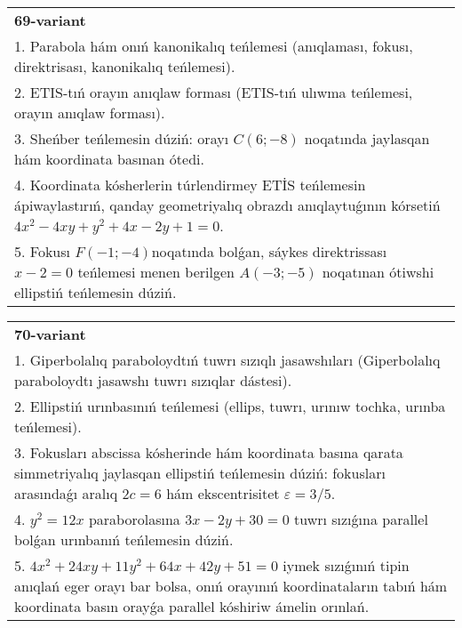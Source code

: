 \documentclass{article}
\begin{document}
\begin{tabular}{m{17cm}}
\textbf{69-variant}\\
1. Parabola hám onıń kanonikalıq teńlemesi (anıqlaması, fokusı, direktrisası, kanonikalıq teńlemesi).\\

2. ETIS-tıń orayın anıqlaw forması (ETIS-tıń ulıwma teńlemesi, orayın anıqlaw forması).\\

3. Sheńber teńlemesin dúziń: orayı $C (6 ;-8) $ noqatında jaylasqan hám koordinata basınan ótedi.\\

4. Koordinata kósherlerin túrlendirmey ETİS teńlemesin ápiwaylastırıń, qanday geometriyalıq obrazdı anıqlaytuǵının kórsetiń $4x^{2} - 4xy + y^{2} + 4x - 2y + 1 = 0$.  \\

5. Fokusı $F( - 1; - 4)$noqatında bolǵan, sáykes direktrissası $x - 2 = 0$ teńlemesi menen berilgen $A( - 3; - 5)$ noqatınan ótiwshi ellipstiń teńlemesin dúziń.  
\end{tabular}
\vspace{1cm}


\begin{tabular}{m{17cm}}
\textbf{70-variant}\\
1. Giperbolalıq paraboloydtıń tuwrı sızıqlı jasawshıları (Giperbolalıq paraboloydtı jasawshı tuwrı sızıqlar dástesi).\\

2. Ellipstiń urınbasınıń teńlemesi (ellips, tuwrı, urınıw tochka, urınba teńlemesi).\\

3. Fokusları abscissa kósherinde hám koordinata basına qarata simmetriyalıq jaylasqan ellipstiń teńlemesin dúziń: fokusları arasındaǵı aralıq $2 c=6$ hám ekscentrisitet $\varepsilon=3/5$.\\

4. $y^{2} = 12x$ paraborolasına $3x - 2y + 30 = 0$ tuwrı sızıǵına parallel bolǵan urınbanıń teńlemesin dúziń.  \\

5. $4x^{2} + 24xy + 11y^{2} + 64x + 42y + 51 = 0$ iymek sızıǵınıń tipin anıqlań eger orayı bar bolsa, onıń orayınıń koordinataların tabıń hám koordinata basın orayǵa parallel kóshiriw ámelin orınlań.  
\end{tabular}
\vspace{1cm}
\end{document}
